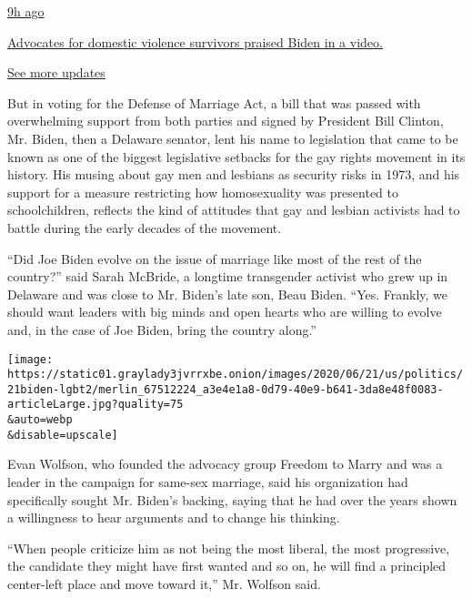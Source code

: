 \href{https://www.nytimes3xbfgragh.onion/live/2020/08/19/us/dnc-convention-election?action=click\&pgtype=Article\&state=default\&region=MAIN_CONTENT_1\&context=storylines_live_updates\#advocates-for-domestic-violence-survivors-praised-biden-in-a-video}{9h
ago}

\href{https://www.nytimes3xbfgragh.onion/live/2020/08/19/us/dnc-convention-election?action=click\&pgtype=Article\&state=default\&region=MAIN_CONTENT_1\&context=storylines_live_updates\#advocates-for-domestic-violence-survivors-praised-biden-in-a-video}{Advocates
for domestic violence survivors praised Biden in a video.}

\href{https://www.nytimes3xbfgragh.onion/live/2020/08/19/us/dnc-convention-election?action=click\&pgtype=Article\&state=default\&region=MAIN_CONTENT_1\&context=storylines_live_updates}{See
more updates}

But in voting for the Defense of Marriage Act, a bill that was passed
with overwhelming support from both parties and signed by President Bill
Clinton, Mr. Biden, then a Delaware senator, lent his name to
legislation that came to be known as one of the biggest legislative
setbacks for the gay rights movement in its history. His musing about
gay men and lesbians as security risks in 1973, and his support for a
measure restricting how homosexuality was presented to schoolchildren,
reflects the kind of attitudes that gay and lesbian activists had to
battle during the early decades of the movement.

``Did Joe Biden evolve on the issue of marriage like most of the rest of
the country?'' said Sarah McBride, a longtime transgender activist who
grew up in Delaware and was close to Mr. Biden's late son, Beau Biden.
``Yes. Frankly, we should want leaders with big minds and open hearts
who are willing to evolve and, in the case of Joe Biden, bring the
country along.''

\texttt{[image: https://static01.graylady3jvrrxbe.onion/images/2020/06/21/us/politics/21biden-lgbt2/merlin\_67512224\_a3e4e1a8-0d79-40e9-b641-3da8e48f0083-articleLarge.jpg?quality=75\\\&auto=webp\\\&disable=upscale]}

Evan Wolfson, who founded the advocacy group Freedom to Marry and was a
leader in the campaign for same-sex marriage, said his organization had
specifically sought Mr. Biden's backing, saying that he had over the
years shown a willingness to hear arguments and to change his thinking.

``When people criticize him as not being the most liberal, the most
progressive, the candidate they might have first wanted and so on, he
will find a principled center-left place and move toward it,'' Mr.
Wolfson said.

